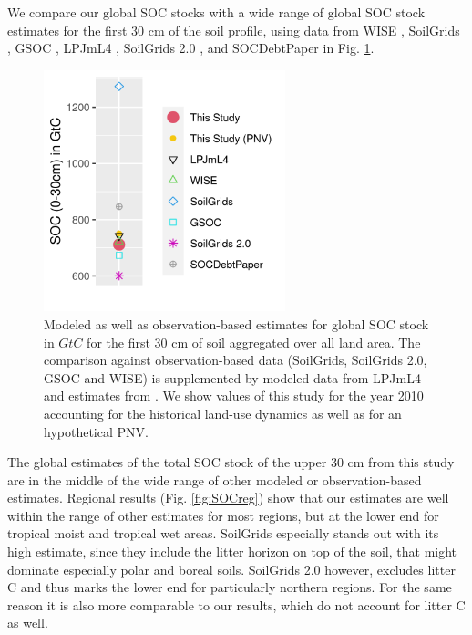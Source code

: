 \documentclass[gc, manuscript]{copernicus}
\begin{document}
We compare our global SOC stocks with a wide range of global SOC stock estimates for the first 30 cm of the soil profile, using data from WISE \citep{batjes_harmonized_2016}, SoilGrids \citep{hengl_soilgrids250m_2017}, GSOC \citep{fao_global_2018}, LPJmL4 \citep{schaphoff_lpjml4_2018-1}, SoilGrids 2.0 \citep{poggio_soilgrids_2021}, and SOCDebtPaper \citep{sanderman_soil_2017} in Fig. \ref{fig:SOCglo}.

\begin{figure}[h]
\includegraphics[width=7cm]{../ResultNotebooks/Output/Images/glo_comparisonfigure} \caption{Modeled as well as observation-based estimates for global SOC stock in $\unit{GtC}$ for the first 30 cm of soil aggregated over all land area. The comparison against observation-based data (SoilGrids, SoilGrids 2.0, GSOC and WISE) is supplemented by modeled data from LPJmL4 \citep{schaphoff_lpjml4_2018-1} and estimates from \citep{sanderman_soil_2017}. We show values of this study for the year 2010 accounting for the historical land-use dynamics as well as for an hypothetical PNV.}\label{fig:SOCglo}
\end{figure}

The global estimates of the total SOC stock of the upper 30 cm from this study are in the middle of the wide range of other modeled or observation-based estimates. Regional results (Fig. \ref{fig:SOCreg}) show that our estimates are well within the range of other estimates for most regions, but at the lower end for tropical moist and tropical wet areas. SoilGrids \citep{hengl_soilgrids250m_2017} especially stands out with its high estimate, since they include the litter horizon on top of the soil, that might dominate especially polar and boreal soils. SoilGrids 2.0 \citep{poggio_soilgrids_2021} however, excludes litter C and thus marks the lower end for particularly northern regions. For the same reason it is also more comparable to our results, which do not account for litter C as well.
\end{document}
